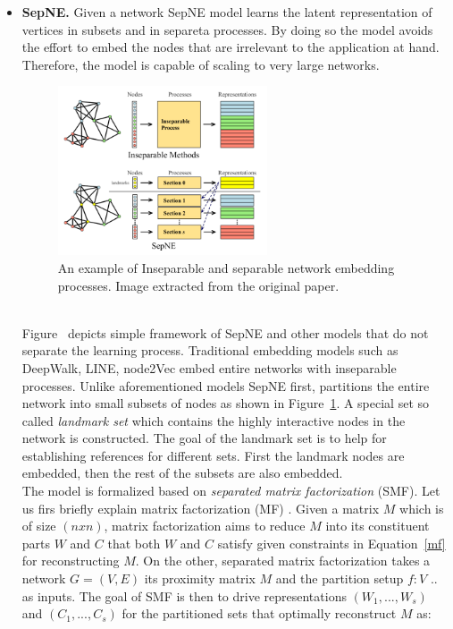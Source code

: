 \begin{itemize}
\item \textbf{SepNE.}
Given a network SepNE model learns the latent representation of vertices in subsets and in separeta processes. By doing so the model avoids the effort to embed the nodes that are irrelevant to the application at hand. Therefore, the model is capable of scaling to very large networks.\\
\begin{figure}[h]
\centering
 \includegraphics[height=5cm]{Figures/fig_SepNE.png}
 \caption{An example of Inseparable and separable network embedding processes. Image extracted from the original paper.}
 \label{fig:SepNE}
\end{figure} \\
Figure~\cite{SepNE} depicts simple framework of SepNE and other models that do not separate the learning process. Traditional embedding models such as DeepWalk, LINE, node2Vec embed entire networks with inseparable processes. Unlike aforementioned models SepNE first, partitions the entire network into small subsets of nodes as shown in Figure~\ref{fig:SepNE}. A special set so called \textit{landmark set} which contains the highly interactive nodes in the network is constructed. The goal of the landmark set is to help for establishing references for different sets. First the landmark nodes are embedded, then the rest of the subsets are also embedded.\\
The model is formalized based on \textit{separated matrix factorization} (SMF). Let us firs briefly explain matrix factorization (MF) . Given a matrix $M$ which is of size $(nxn)$, matrix factorization aims to reduce $M$ into its constituent parts $W$ and $C$ that both $W$ and $C$ satisfy given constraints in Equation~\ref{mf} for reconstructing $M$. On the other, separated matrix factorization takes a network $G=(V,E)$ its proximity matrix $M$ and the partition setup $f : V $ .. as inputs. The goal of SMF is then to drive representations $(W_1, ..., W_s)$ and $(C_1, ..., C_s)$ for the partitioned sets that optimally reconstruct $M$ as: \\

\end{itemize}
